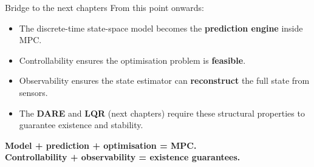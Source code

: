 \documentclass[aspectratio=169,10pt]{beamer}
\begin{document}
\begin{frame}{Bridge to the next chapters}
From this point onwards:
\begin{itemize}
  \item The discrete-time state-space model becomes the \textbf{prediction
        engine} inside MPC.
  \item Controllability ensures the optimisation problem is
        \textbf{feasible}.
  \item Observability ensures the state estimator can \textbf{reconstruct}
        the full state from sensors.
  \item The \textbf{DARE} and \textbf{LQR} (next chapters) require these
        structural properties to guarantee existence and stability.
\end{itemize}

\begin{center}
\textbf{Model + prediction + optimisation = MPC.}\\
\textbf{Controllability + observability = existence guarantees.}
\end{center}
\end{frame}
\end{document}
